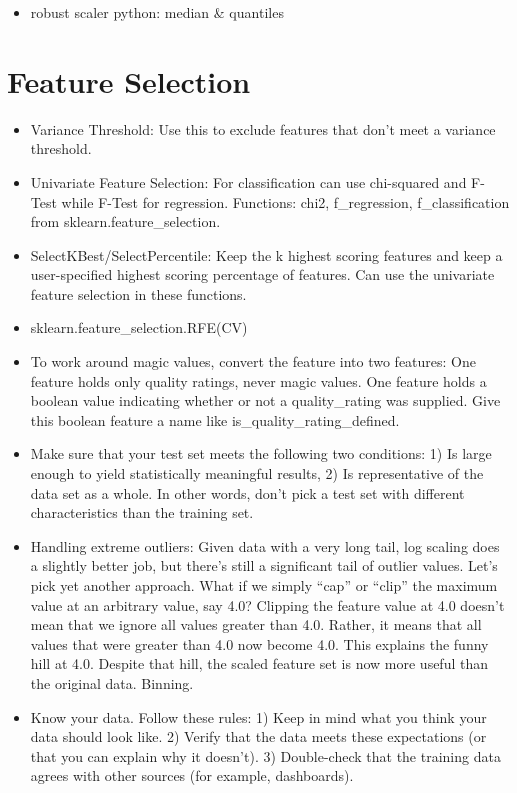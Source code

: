 \documentclass[]{book}
\providecommand{\tightlist}{%
  \setlength{\itemsep}{0pt}\setlength{\parskip}{0pt}}
\theoremstyle{definition}
\theoremstyle{definition}
\theoremstyle{definition}
\theoremstyle{remark}
\begin{document}
\begin{itemize}
\tightlist
\item
  robust scaler python: median \& quantiles
\end{itemize}

\section{Feature Selection}\label{feature-selection}

\begin{itemize}
\item
  Variance Threshold: Use this to exclude features that don't meet a
  variance threshold.
\item
  Univariate Feature Selection: For classification can use chi-squared
  and F-Test while F-Test for regression. Functions: chi2,
  f\_regression, f\_classification from sklearn.feature\_selection.
\item
  SelectKBest/SelectPercentile: Keep the k highest scoring features and
  keep a user-specified highest scoring percentage of features. Can use
  the univariate feature selection in these functions.
\item
  sklearn.feature\_selection.RFE(CV)
\item
  To work around magic values, convert the feature into two features:
  One feature holds only quality ratings, never magic values. One
  feature holds a boolean value indicating whether or not a
  quality\_rating was supplied. Give this boolean feature a name like
  is\_quality\_rating\_defined.
\item
  Make sure that your test set meets the following two conditions: 1) Is
  large enough to yield statistically meaningful results, 2) Is
  representative of the data set as a whole. In other words, don't pick
  a test set with different characteristics than the training set.
\item
  Handling extreme outliers: Given data with a very long tail, log
  scaling does a slightly better job, but there's still a significant
  tail of outlier values. Let's pick yet another approach. What if we
  simply ``cap'' or ``clip'' the maximum value at an arbitrary value,
  say 4.0? Clipping the feature value at 4.0 doesn't mean that we ignore
  all values greater than 4.0. Rather, it means that all values that
  were greater than 4.0 now become 4.0. This explains the funny hill at
  4.0. Despite that hill, the scaled feature set is now more useful than
  the original data. Binning.
\item
  Know your data. Follow these rules: 1) Keep in mind what you think
  your data should look like. 2) Verify that the data meets these
  expectations (or that you can explain why it doesn't). 3) Double-check
  that the training data agrees with other sources (for example,
  dashboards).
\end{itemize}
\end{document}
